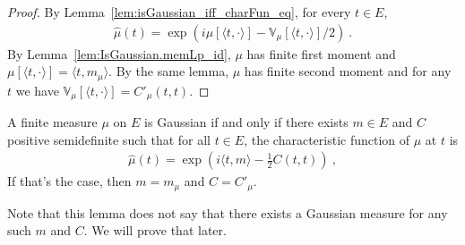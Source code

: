 \begin{proof}\leanok
By Lemma~\ref{lem:isGaussian_iff_charFun_eq}, for every $t \in E$,
\begin{align*}
  \hat{\mu}(t) = \exp\left(i \mu[\langle t, \cdot \rangle] - \mathbb{V}_\mu[\langle t, \cdot \rangle] / 2\right) \: .
\end{align*}
By Lemma~\ref{lem:IsGaussian.memLp_id}, $\mu$ has finite first moment and $\mu[\langle t, \cdot \rangle] = \langle t, m_\mu \rangle$. By the same lemma, $\mu$ has finite second moment and for any $t$ we have $\mathbb{V}_\mu[\langle t, \cdot\rangle] = C'_\mu(t, t)$.
\end{proof}

\begin{lemma}\label{lem:isGaussian_iff_gaussian_charFun}
  \leanok
A finite measure $\mu$ on $E$ is Gaussian if and only if there exists $m \in E$ and $C$ positive semidefinite such that for all $t \in E$, the characteristic function of $\mu$ at $t$ is
\begin{align*}
  \hat{\mu}(t) = \exp\left(i \langle t, m \rangle - \frac{1}{2} C(t, t)\right) \: ,
\end{align*}
If that's the case, then $m = m_\mu$ and $C = C'_\mu$.
\end{lemma}

Note that this lemma does not say that there exists a Gaussian measure for any such $m$ and $C$.
We will prove that later.

